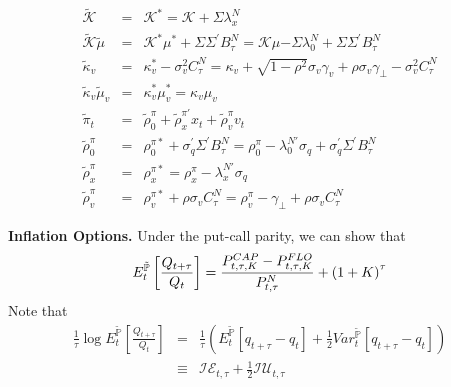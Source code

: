 \documentclass{article}
\begin{document}
\begin{eqnarray*}
\mathcal{\tilde{K}} &=&\mathcal{K}^{\ast }=\mathcal{K+}\Sigma \lambda
_{x}^{N} \\
\mathcal{\tilde{K}}\tilde{\mu} &=&\mathcal{K}^{\ast }\mu ^{\ast }+\Sigma
\Sigma ^{\prime }B_{\tau }^{N}=\mathcal{K}\mu \mathcal{-}\Sigma \lambda
_{0}^{N}+\Sigma \Sigma ^{\prime }B_{\tau }^{N} \\
\tilde{\kappa}_{v} &=&\kappa _{v}^{\ast }-\sigma _{v}^{2}C_{\tau
}^{N}=\kappa _{v}+\sqrt{1-\rho ^{2}}\sigma _{v}\gamma _{v}+\rho \sigma
_{v}\gamma _{\bot }-\sigma _{v}^{2}C_{\tau }^{N} \\
\tilde{\kappa}_{v}\tilde{\mu}_{v} &=&\kappa _{v}^{\ast }\mu _{v}^{\ast
}=\kappa _{v}\mu _{v} \\
\tilde{\pi}_{t} &=&\widetilde{\rho }_{0}^{\pi }+\widetilde{\rho }_{x}^{\pi
\prime }x_{t}+\widetilde{\rho }_{v}^{\pi }v_{t} \\
\widetilde{\rho }_{0}^{\pi } &=&\rho _{0}^{\pi \ast }+\sigma _{q}^{\prime
}\Sigma ^{\prime }B_{\tau }^{N}=\rho _{0}^{\pi }-\lambda _{0}^{N\prime
}\sigma _{q}+\sigma _{q}^{\prime }\Sigma ^{\prime }B_{\tau }^{N} \\
\widetilde{\rho }_{x}^{\pi } &=&\rho _{x}^{\pi \ast }=\rho _{x}^{\pi
}-\lambda _{x}^{N\prime }\sigma _{q} \\
\widetilde{\rho }_{v}^{\pi } &=&\rho _{v}^{\pi \ast }+\rho \sigma
_{v}C_{\tau }^{N}=\rho _{v}^{\pi }-\gamma _{\bot }+\rho \sigma _{v}C_{\tau
}^{N}
\end{eqnarray*}

\textbf{Inflation Options.} Under the put-call parity, we can show that 
\begin{equation*}
E_{t}^{\mathbb{\tilde{P}}}\left[ \frac{Q_{t+\tau }}{Q_{t}}\right] =\frac{%
P_{t,\tau ,K}^{CAP}-P_{t,\tau ,K}^{FLO}}{P_{t,\tau }^{N}}+\left( 1+K\right)
^{\tau }
\end{equation*}%
Note that 
\begin{eqnarray*}
\frac{1}{\tau }\log E_{t}^{\mathbb{\tilde{P}}}\left[ \frac{Q_{t+\tau }}{Q_{t}%
}\right]  &=&\frac{1}{\tau }\left( E_{t}^{\mathbb{\tilde{P}}}\left[
q_{t+\tau }-q_{t}\right] +\frac{1}{2}Var_{t}^{\mathbb{\tilde{P}}}\left[
q_{t+\tau }-q_{t}\right] \right)  \\
&\equiv &\mathcal{IE}_{t,\tau }+\frac{1}{2}\mathcal{IU}_{t,\tau }
\end{eqnarray*}
\end{document}
